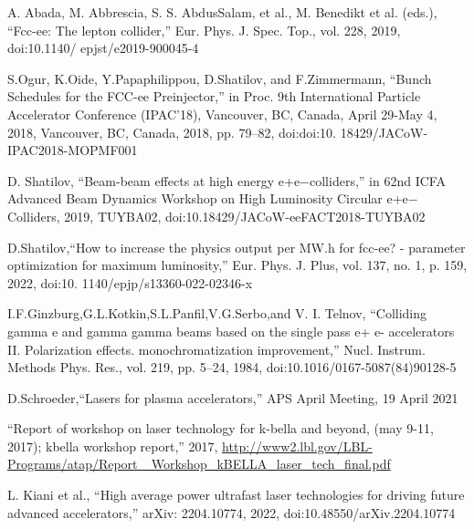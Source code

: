 \documentclass[a4paper,
    keeplastbox,   %
]{jacow}
\begin{document}
    {\printbibliography}%
    {%

        \begin{thebibliography}{99}   %

            	A. Abada, M. Abbrescia, S. S. AbdusSalam, et al., M. Benedikt et al. (eds.), “Fcc-ee: The lepton collider,” Eur. Phys. J. Spec. Top., vol. 228, 2019, doi:10.1140/ epjst/e2019-900045-4

            	S.Ogur, K.Oide, Y.Papaphilippou, D.Shatilov, and F.Zimmermann, “Bunch Schedules for the FCC-ee Preinjector,” in Proc. 9th International Particle Accelerator Conference (IPAC’18), Vancouver, BC, Canada, April 29-May 4, 2018, Vancouver, BC, Canada, 2018, pp. 79–82, doi:doi:10. 18429/JACoW-IPAC2018-MOPMF001

            	D. Shatilov, “Beam-beam effects at high energy e+e−colliders,” in 62nd ICFA Advanced Beam Dynamics Workshop on High Luminosity Circular e+e− Colliders, 2019, TUYBA02, doi:10.18429/JACoW-eeFACT2018-TUYBA02

            	D.Shatilov,“How to increase the physics output per MW.h for fcc-ee? - parameter optimization for maximum luminosity,” Eur. Phys. J. Plus, vol. 137, no. 1, p. 159, 2022, doi:10. 1140/epjp/s13360-022-02346-x

             I.F.Ginzburg,G.L.Kotkin,S.L.Panfil,V.G.Serbo,and V. I. Telnov, “Colliding gamma e and gamma gamma beams based on the single pass e+ e- accelerators II. Polarization effects. monochromatization improvement,” Nucl. Instrum. Methods Phys. Res., vol. 219, pp. 5–24, 1984, doi:10.1016/0167-5087(84)90128-5


             D.Schroeder,“Lasers for plasma accelerators,” APS April Meeting, 19 April 2021

             “Report of workshop on laser technology for k-bella and beyond, (may 9-11, 2017); kbella workshop report,” 2017, \url{http://www2.lbl.gov/LBL-Programs/atap/Report_ Workshop_kBELLA_laser_tech_final.pdf}

             L. Kiani et al., “High average power ultrafast laser technologies for driving future advanced accelerators,” arXiv: 2204.10774, 2022, doi:10.48550/arXiv.2204.10774


\end{thebibliography}}
\end{document}
